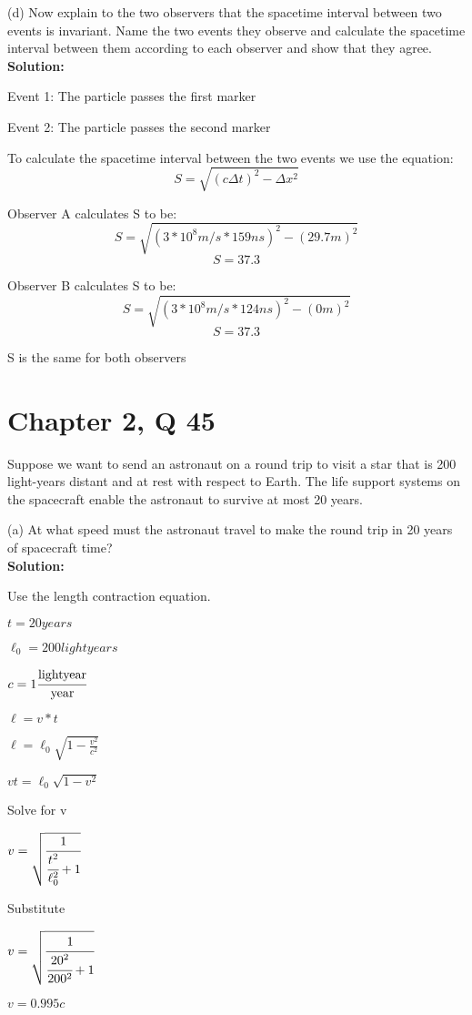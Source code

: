 \documentclass{article}
\begin{document}
(d) Now explain to the two observers that the spacetime interval between two events is invariant. Name the two events they observe and calculate the spacetime interval between them according to each observer and show that they agree. \\

\textbf{Solution:}

Event 1: The particle passes the first marker

Event 2: The particle passes the second marker

To calculate the spacetime interval between the two events we use the equation:
$$ S = \sqrt{(c \Delta t)^2 - \Delta x^2} $$

Observer A calculates S to be:
$$ S = \sqrt{(3*10^8 m/s * 159ns)^2 - (29.7m)^2 } $$
$$ S =  37.3$$

Observer B calculates S to be:
$$ S = \sqrt{(3*10^8 m/s * 124ns)^2 - (0m)^2 } $$
$$ S = 37.3$$

S is the same for both observers


\section*{Chapter 2, Q 45}
Suppose we want to send an astronaut on a round trip to
visit a star that is 200 light-years distant and at rest with
respect to Earth. The life support systems on the spacecraft
enable the astronaut to survive at most 20 years.

(a) At what speed must the astronaut travel to make the round trip in
20 years of spacecraft time? \\

\textbf{Solution:}

Use the length contraction equation.

$t = 20 years$

$\ell_0 = 200 lightyears$

$c = 1 \cfrac{\text{lightyear}}{\text{year}} $

$\ell = v * t$

$\ell = \ell_0 \sqrt{1 - \frac{v^2}{c^2}}$

$vt = \ell_0 \sqrt{1 - v^2}$

Solve for v

$v = \sqrt{\cfrac{1}{\cfrac{t^2}{\ell_0^2} + 1}}$

Substitute

$v = \sqrt{\cfrac{1}{\cfrac{20^2}{200^2} + 1}}$

$v = 0.995 c$ \\
\end{document}
